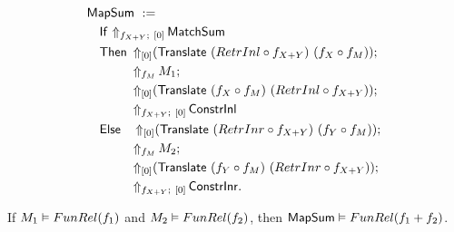 \begin{definition}[$\MS{MapSum}$][MapSum]
  \label{def:MapSum}
  ~
  \begin{align*}
    & \MS{MapSum}~:= \\
    &\quad \MS{If}~{\LiftBoth{\MS{MatchSum}}{f_{X+Y}}{\Vector{0}}} \\
    &\quad \MS{Then}~ \LiftTapes{(\MS{Translate}~(RetrInl \circ f_{X+Y})~(f_X \circ f_M))}{\Vector{0}} \Seq \\
    &\quad \phantom{\MS{Then}}~ \LiftAlphabet{M_1}{f_M} \Seq \\
    &\quad \phantom{\MS{Then}}~ \LiftTapes{(\MS{Translate}~(f_X \circ f_M)~(RetrInl \circ f_{X+Y}))}{\Vector{0}} \Seq \\
    &\quad \phantom{\MS{Then}}~ \LiftBoth{\MS{ConstrInl}}{f_{X+Y}}{\Vector{0}} \\
    &\quad \MS{Else}~~~ \LiftTapes{(\MS{Translate}~(RetrInr \circ f_{X+Y})~(f_Y \circ f_M))}{\Vector{0}} \Seq \\
    &\quad \phantom{\MS{Then}}~ \LiftAlphabet{M_2}{f_M} \Seq \\
    &\quad \phantom{\MS{Then}}~ \LiftTapes{(\MS{Translate}~(f_Y \circ f_M)~(RetrInr \circ f_{X+Y}))}{\Vector{0}} \Seq \\
    &\quad \phantom{\MS{Then}}~ \LiftBoth{\MS{ConstrInr}}{f_{X+Y}}{\Vector{0}}.
  \end{align*}

\end{definition}

\begin{lemma}
  \label{lem:MapSum_Computes}
  If $M_1 \mathrel{\vDash} FunRel(f_1)$ and $M_2 \mathrel{\vDash} FunRel(f_2)$, then $\mathsf{MapSum} \mathrel{\vDash} FunRel(f_1+f_2)$.
\end{lemma}


